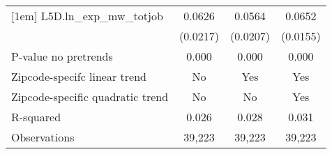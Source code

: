 {\begin{tabular}{l*{3}{c}}
[1em]
L5D.ln_exp_mw_totjob&   0.0626\sym{**} &   0.0564\sym{**} &   0.0652\sym{***}\\
          & (0.0217)         & (0.0207)         & (0.0155)         \\
\hline
P-value no pretrends&    0.000         &    0.000         &    0.000         \\
Zipcode-specifc linear trend&       No         &      Yes         &      Yes         \\
Zipcode-specific quadratic trend&       No         &       No         &      Yes         \\
R-squared &    0.026         &    0.028         &    0.031         \\
Observations&   39,223         &   39,223         &   39,223         \\
\hline\hline
\end{tabular}
}

